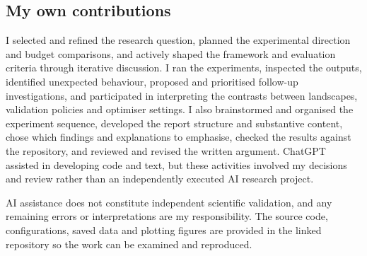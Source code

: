 \documentclass[11pt,a4paper]{article}
\begin{document}
\subsection*{My own contributions}
I selected and refined the research question, planned the experimental direction and budget comparisons, and actively shaped the framework and evaluation criteria through iterative discussion. I ran the experiments, inspected the outputs, identified unexpected behaviour, proposed and prioritised follow-up investigations, and participated in interpreting the contrasts between landscapes, validation policies and optimiser settings. I also brainstormed and organised the experiment sequence, developed the report structure and substantive content, chose which findings and explanations to emphasise, checked the results against the repository, and reviewed and revised the written argument. ChatGPT assisted in developing code and text, but these activities involved my decisions and review rather than an independently executed AI research project.

AI assistance does not constitute independent scientific validation, and any remaining errors or interpretations are my responsibility. The source code, configurations, saved data and plotting figures are provided in the linked repository so the work can be examined and reproduced.
\end{document}
